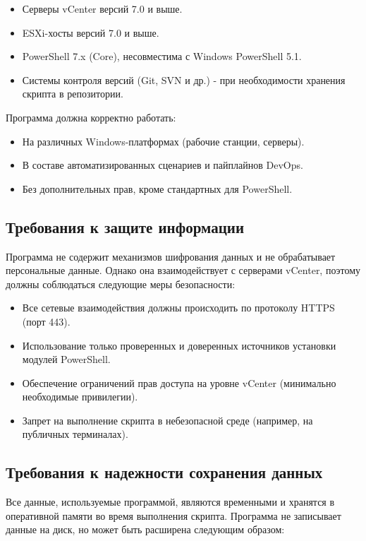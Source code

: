 \begin{itemize}
    \item Серверы vCenter версий 7.0 и выше.
    \item ESXi-хосты версий 7.0 и выше.
    \item PowerShell 7.x (Core), несовместима с Windows PowerShell 5.1.
    \item Системы контроля версий (Git, SVN и др.) - при необходимости хранения скрипта в репозитории.
\end{itemize}

Программа должна корректно работать:

\begin{itemize}
    \item На различных Windows-платформах (рабочие станции, серверы).
    \item В составе автоматизированных сценариев и пайплайнов DevOps.
    \item Без дополнительных прав, кроме стандартных для PowerShell.
\end{itemize}

\subsection{Требования к защите информации}
Программа не содержит механизмов шифрования данных и не обрабатывает персональные данные. Однако она взаимодействует с серверами vCenter, поэтому должны соблюдаться следующие меры безопасности:

\begin{itemize}
    \item Все сетевые взаимодействия должны происходить по протоколу HTTPS (порт 443).
    \item Использование только проверенных и доверенных источников установки модулей PowerShell.
    \item Обеспечение ограничений прав доступа на уровне vCenter (минимально необходимые привилегии).
    \item Запрет на выполнение скрипта в небезопасной среде (например, на публичных терминалах).
\end{itemize}

\subsection{Требования к надежности сохранения данных}
Все данные, используемые программой, являются временными и хранятся в оперативной памяти во время выполнения скрипта. Программа не записывает данные на диск, но может быть расширена следующим образом:

